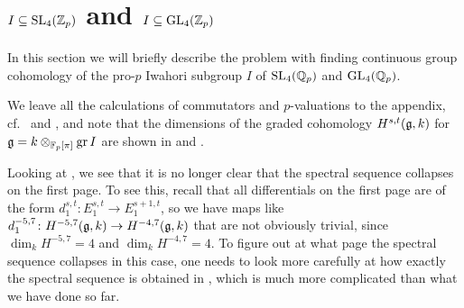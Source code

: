 \section[\texorpdfstring{$I \subseteq \SL_{4}(\Z_{p}),\GL_{4}(\Z_{p})$}{I in SL4(Zp) and GL4()}]{\texorpdfstring{$I \subseteq \operatorname{SL}_{4}(\mathbb{Z}_{p})$ and $I \subseteq \operatorname{GL}_{4}(\mathbb{Z}_{p})$}{I in SL4(Zp) and GL4(Zp)}}%
\label{sec:Iwa-SL4-GL4}

In this section we will briefly describe the problem with finding continuous group cohomology of the pro-$p$ Iwahori subgroup $I$ of $\operatorname{SL}_{4}(\mathbb{Q}_{p})$ and $\operatorname{GL}_{4}(\mathbb{Q}_{p})$.

We leave all the calculations of commutators and $p$-valuations to the appendix, cf.\  and , and note that the dimensions of the graded cohomology $H^{s,t}(\mathfrak{g},k)$ for $\mathfrak{g} = k \otimes_{\mathbb{F}_{p}[\pi]} \operatorname{gr} I$ are shown in  and .

Looking at , we see that it is no longer clear that the spectral sequence collapses on the first page. To see this, recall that all differentials on the first page are of the form $d_{1}^{s,t} \colon E_{1}^{s,t} \to E_{1}^{s+1,t}$, so we have maps like $d_{1}^{-5,7} \colon H^{-5,7}(\mathfrak{g},k) \to H^{-4,7}(\mathfrak{g},k)$ that are not obviously trivial, since $\dim_{k} H^{-5,7} = 4$ and $\dim_{k} H^{-4,7} = 4$. To figure out at what page the spectral sequence collapses in this case, one needs to look more carefully at how exactly the spectral sequence is obtained in \cite{Sor}, which is much more complicated than what we have done so far.

